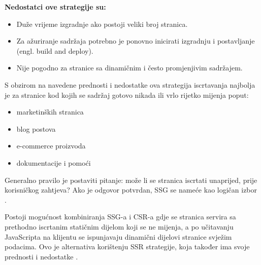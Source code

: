 \bigskip

\textbf{Nedostatci ove strategije su:}

\begin{itemize}
    \item Duže vrijeme izgradnje ako postoji veliki broj stranica.
    \item Za ažuriranje sadržaja potrebno je ponovno inicirati izgradnju i postavljanje (engl. build and deploy).
    \item Nije pogodno za stranice sa dinamičnim i često promjenjivim sadržajem.
\end{itemize}

S obzirom na navedene prednosti i nedostatke ova strategija iscrtavanja najbolja je za stranice kod kojih se sadržaj gotovo nikada ili vrlo rijetko mijenja poput:
\begin{itemize}
    \item marketinških stranica
    \item blog postova
    \item e-commerce proizvoda
    \item dokumentacije i pomoći
\end{itemize}
Generalno pravilo je postaviti pitanje: može li se stranica iscrtati unaprijed, prije korisničkog zahtjeva? Ako je odgovor potvrdan, SSG se nameće kao logičan izbor \cite{nextjsssg}.

Postoji mogućnost kombiniranja SSG-a i CSR-a gdje se stranica servira sa prethodno iscrtanim statičnim dijelom koji se ne mijenja, a po učitavanju JavaScripta na klijentu se ispunjavaju dinamični dijelovi stranice svježim podacima. Ovo je alternativa korištenju SSR strategije, koja također ima svoje prednosti i nedostatke \cite{nextjsssg}.

